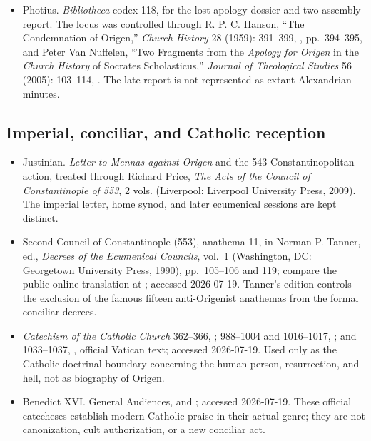 \begin{itemize}
hagiographic reception of the sixth-century conflict, not as neutral conciliar
minutes; copyrighted English is paraphrased.
\item Photius. \emph{Bibliotheca} codex 118, for the lost apology dossier and
two-assembly report. The locus was controlled through R. P. C. Hanson,
``The Condemnation of Origen,'' \emph{Church History} 28 (1959): 391--399,
, pp.~394--395, and
Peter Van Nuffelen, ``Two Fragments from the \emph{Apology for Origen} in the
\emph{Church History} of Socrates Scholasticus,'' \emph{Journal of Theological
Studies} 56 (2005): 103--114,
. The late report is
not represented as extant Alexandrian minutes.
\end{itemize}

\subsection{Imperial, conciliar, and Catholic reception}

\begin{itemize}
\item Justinian. \emph{Letter to Mennas against Origen} and the 543
Constantinopolitan action, treated through Richard Price, \emph{The Acts of the
Council of Constantinople of 553}, 2 vols. (Liverpool: Liverpool University
Press, 2009). The imperial letter, home synod, and later ecumenical sessions are
kept distinct.
\item Second Council of Constantinople (553), anathema 11, in Norman P. Tanner,
ed., \emph{Decrees of the Ecumenical Councils}, vol.~1 (Washington, DC:
Georgetown University Press, 1990), pp.~105--106 and 119; compare the public online
translation at
; accessed
2026-07-19. Tanner's edition controls the exclusion of the famous fifteen
anti-Origenist anathemas from the formal conciliar decrees.
\item \emph{Catechism of the Catholic Church} 362--366,
;
988--1004 and 1016--1017,
; and 1033--1037,
, official Vatican text; accessed 2026-07-19. Used only as the Catholic
doctrinal boundary concerning the human person, resurrection, and hell, not as
biography of Origen.
\item Benedict XVI. General Audiences,
 and
; accessed
2026-07-19. These official catecheses establish modern Catholic praise in their
actual genre; they are not canonization, cult authorization, or a new conciliar
act.
\end{itemize}


